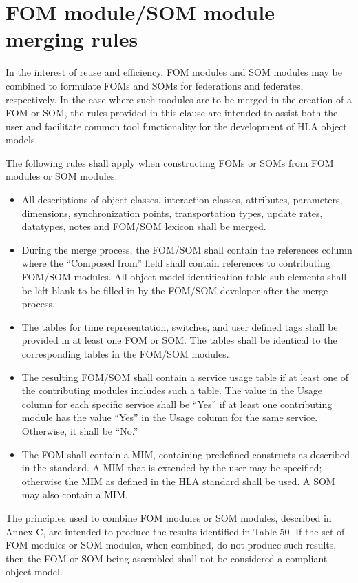 \section{FOM module/SOM module merging rules}
In the interest of reuse and efficiency, FOM modules and SOM modules may be combined to formulate FOMs and SOMs for federations and federates, respectively. In the case where such modules are to be merged in the creation of a FOM or SOM, the rules provided in this clause are intended to assist both the user and facilitate common tool functionality for the development of HLA object models.

The following rules shall apply when constructing FOMs or SOMs from FOM modules or SOM modules:
\begin{itemize}[leftmargin=32pt,labelsep=12pt,itemsep=1.5pt,topsep=2pt]
\item All descriptions of object classes, interaction classes, attributes, parameters, dimensions, synchronization points, transportation types, update rates, datatypes, notes and FOM/SOM lexicon shall be merged.
\item During the merge process, the FOM/SOM shall contain the references column where the ``Composed from'' field shall contain references to contributing FOM/SOM modules. All object model identification table sub-elements shall be left blank to be filled-in by the FOM/SOM developer after the merge process.
\item The tables for time representation, switches, and user defined tags shall be provided in at least one FOM or SOM. The tables shall be identical to the corresponding tables in the FOM/SOM modules.
\item The resulting FOM/SOM shall contain a service usage table if at least one of the contributing modules includes such a table. The value in the Usage column for each specific service shall be ``Yes'' if at least one contributing module has the value ``Yes'' in the Usage column for the same service. Otherwise, it shall be ``No.''
\item The FOM shall contain a MIM, containing predefined constructs as described in the standard. A MIM that is extended by the user may be specified; otherwise the MIM as defined in the HLA standard shall be used. A SOM may also contain a MIM.
\end{itemize}

The principles used to combine FOM modules or SOM modules, described in Annex C, are intended to produce the results identified in Table 50. If the set of FOM modules or SOM modules, when combined, do not produce such results, then the FOM or SOM being assembled shall not be considered a compliant object model.

